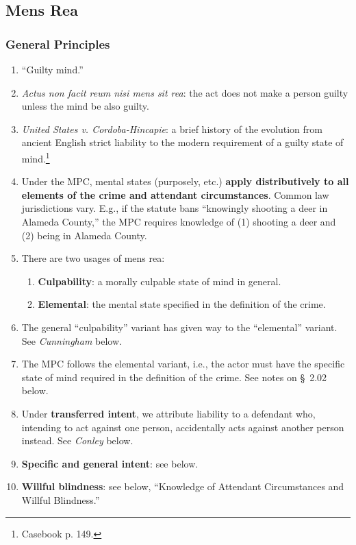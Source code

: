 \subsection{Mens Rea}

\subsubsection{General Principles}

\begin{enumerate}
    \item ``Guilty mind.''
    \item \emph{Actus non facit reum nisi mens sit rea}: the act does not make 
    a person guilty unless the mind be also guilty.
    \item \emph{United States v. Cordoba-Hincapie}: a brief history of the 
    evolution from ancient English strict liability to the modern requirement 
    of a guilty state of mind.\footnote{Casebook p. 149.}
    \item Under the MPC, mental states (purposely, etc.) \textbf{apply 
    distributively to all elements of the crime and attendant circumstances}. 
    Common law jurisdictions vary.  E.g., if the statute bans ``knowingly 
    shooting a deer in Alameda County,'' the MPC requires knowledge of (1) 
    shooting a deer and (2) being in Alameda County.
    \item There are two usages of mens rea:
    \begin{enumerate}
        \item \textbf{Culpability}: a morally culpable state of mind in 
        general.
        \item \textbf{Elemental}: the mental state specified in the definition 
        of the crime.
    \end{enumerate}
    \item The general ``culpability'' variant has given way to the 
    ``elemental'' variant. See \emph{Cunningham} below.
    \item The MPC follows the elemental variant, i.e., the actor must have the 
    specific state of mind required in the definition of the crime. See 
    notes on \S\ 2.02 below.
    \item Under \textbf{transferred intent}, we attribute liability to a 
    defendant who, intending to act against one person, accidentally acts 
    against another person instead. See \emph{Conley} below.
    \item \textbf{Specific and general intent}: see below.
    \item \textbf{Willful blindness}: see below, ``Knowledge of Attendant 
    Circumstances and Willful Blindness.''
\end{enumerate}

